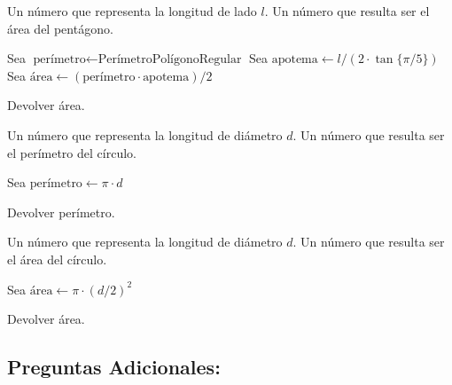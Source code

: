 \documentclass[12pt, letterpaper]{article}
\begin{document}
\begin{algorithm}[H]
\caption{ÁreaPentágono}
\begin{algorithmic}[1] 
    
    \Require Un número que representa la longitud de lado $l$.
    \Ensure Un número  que resulta ser el área del pentágono.   

    \State Sea $\text{perímetro} \leftarrow \text{PerímetroPolígonoRegular}$
    \State Sea $\text{apotema} \leftarrow l / (2 \cdot \tan\{ \pi/5 \})$ 
    \State Sea $\text{área} \leftarrow (\text{perímetro} \cdot \text{apotema}) /2$

    \State Devolver área.

\end{algorithmic}
\end{algorithm}

\begin{algorithm}[H]
\caption{PerímetroCírculo}
\begin{algorithmic}[1] 
    
    \Require Un número que representa la longitud de diámetro $d$.
    \Ensure Un número  que resulta ser el perímetro del círculo.   

    \State Sea $\text{perímetro} \leftarrow \pi \cdot d$

    \State Devolver perímetro.

\end{algorithmic}
\end{algorithm}

\begin{algorithm}[H]
\caption{ÁreaCírculo}
\begin{algorithmic}[1] 
    
    \Require Un número que representa la longitud de diámetro $d$.
    \Ensure Un número  que resulta ser el área del círculo.   

    \State Sea $\text{área} \leftarrow \pi \cdot (d/2)^2$

    \State Devolver área.

\end{algorithmic}
\end{algorithm}

\subsection*{Preguntas Adicionales:}
\end{document}
